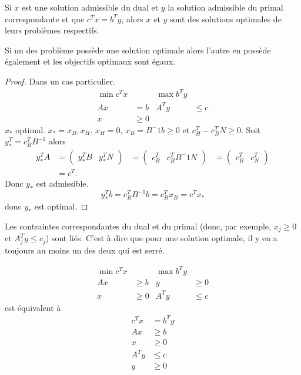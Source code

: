\begin{mycorr}
  Si $x$ est une solution admissible du dual et $y$ la solution
  admissible du primal correspondante
  et que $c^Tx = b^Ty$, alors $x$ et $y$ sont
  des solutions optimales de leurs problèmes respectifs.
\end{mycorr}

\begin{mytheo}
  Si un des problème possède une solution optimale alors l'autre en possède
  également et les objectifs optimaux sont égaux.
  \begin{proof}
    Dans un cas particulier.
    \begin{align*}
      \min c^T x & & \max b^T y\\
      Ax & = b & A^Ty & \leq c\\
      x & \geq 0
    \end{align*}
    $x_*$ optimal.
    $x_* = x_B, x_H$.
    $x_H = 0$, $x_B = B^-1b \geq 0$ et $c_H^T - c_B^T N \geq 0$.
    Soit $y_*^T = c_B^T B^{-1}$ alors
    \begin{align*}
      y_*^TA & = \begin{pmatrix}y_*^TB & y_*^TN\end{pmatrix}
      & = \begin{pmatrix}c_B^T & c_B^TB^-1N\end{pmatrix}
      & = \begin{pmatrix}c_B^T & c_N^T\end{pmatrix}\\
      & =  c^T.
    \end{align*}
    Donc $y_*$ est admissible.
    \[ y_*^Tb = c_B^TB^{-1}b = c_B^Tx_B = c^Tx_* \]
    donc $y_*$ est optimal.
  \end{proof}
\end{mytheo}

\begin{myprop}
  Les contraintes correspondantes du dual et du primal
  (donc, par exemple, $x_j \geq 0$ et $A_j^T y \leq c_j$) sont liés.
  C'est à dire que pour une solution optimale, il y en a toujours
  au moins un des deux qui est serré.
\end{myprop}

\begin{mycorr}
  \begin{align*}
    \min c^Tx & & \max b^Ty\\
    Ax & \geq b & y & \geq 0\\
    x & \geq 0 & A^Ty & \leq c
  \end{align*}
  est équivalent à
  \begin{align*}
    c^Tx & = b^Ty\\
    Ax & \geq b\\
    x & \geq 0\\
    A^Ty & \leq c\\
    y & \geq 0
  \end{align*}
\end{mycorr}

